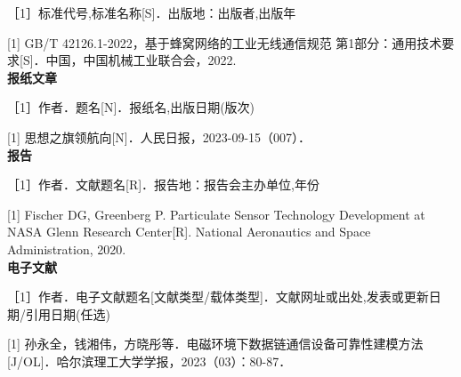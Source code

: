 ［1］标准代号,标准名称[S]．出版地：出版者,出版年

{\color{red}
[1] GB/T 42126.1-2022，基于蜂窝网络的工业无线通信规范 第1部分：通用技术要求[S]．中国，中国机械工业联合会，2022.
} \\

\textbf{报纸文章}

［1］作者．题名[N]．报纸名,出版日期(版次)

{\color{red}
[1] 思想之旗领航向[N]．人民日报，2023-09-15（007）．
} \\

\textbf{报告}

［1］作者．文献题名[R]．报告地：报告会主办单位,年份

{\color{red}
[1] Fischer DG, Greenberg P. Particulate Sensor Technology Development at NASA Glenn Research Center[R]. National Aeronautics and Space Administration, 2020.
} \\

\textbf{电子文献}

［1］作者．电子文献题名[文献类型/载体类型]．文献网址或出处,发表或更新日期/引用日期(任选)

{\color{red}
[1] 孙永全，钱湘伟，方晓彤等．电磁环境下数据链通信设备可靠性建模方法[J/OL]．哈尔滨理工大学学报，2023（03）：80-87．
}

%

\setlength{\parindent}{\oldparindent}
